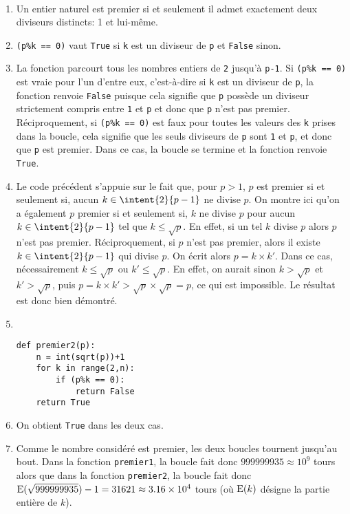\begin{correction}~
	\begin{enumerate}
		\item Un entier naturel est premier si et seulement il admet exactement deux diviseurs distincts: 1 et lui-même.
		\item \texttt{(p\%k == 0)} vaut \texttt{True} si \texttt{k} est un diviseur de \texttt{p} et \texttt{False} sinon.
		\item La fonction parcourt tous les nombres entiers de \texttt{2} jusqu'à \texttt{p-1}. Si \texttt{(p\%k == 0)} est vraie pour l'un d'entre eux, c'est-à-dire si \texttt{k} est un diviseur de \texttt{p}, la fonction renvoie \texttt{False} puisque cela signifie que \texttt{p} possède un diviseur strictement compris entre \texttt{1} et \texttt{p} et donc que \texttt{p} n'est pas premier. Réciproquement, si \texttt{(p\%k == 0)} est faux pour toutes les valeurs des \texttt{k} prises dans la boucle, cela signifie que les seuls diviseurs de \texttt{p} sont \texttt{1} et \texttt{p}, et donc que \texttt{p} est premier. Dans ce cas, la boucle se termine et la fonction renvoie \texttt{True}.
		\item Le code précédent s'appuie sur le fait que, pour $p>1$, $p$ est premier si et seulement si, aucun $k\in\intent{2}{p-1}$ ne divise $p$. On montre ici qu'on a également $p$ premier si et seulement si, $k$ ne divise $p$ pour aucun $k\in\intent{2}{p-1}$ tel que $k\leq \sqrt{p}$. En effet, si un tel $k$ divise $p$ alors $p$ n'est pas premier. Réciproquement, si $p$ n'est pas premier, alors il existe $k\in\intent{2}{p-1}$ qui divise $p$. On écrit alors $p=k\times k'$. Dans ce cas, nécessairement $k\leq \sqrt{p}$ ou $k'\leq \sqrt{p}$. En effet, on aurait sinon $k>\sqrt{p}$ et $k'>\sqrt{p}$, puis $p=k\times k'>\sqrt{p}\times \sqrt{p}=p$, ce qui est impossible. Le résultat est donc bien démontré.
		\item ~
		\begin{center}
			\begin{varwidth}[t]{.5\textwidth}
				\begin{lstlisting}[language=iPython,linewidth = 7cm]
def premier2(p):
	n = int(sqrt(p))+1
    for k in range(2,n):
        if (p%k == 0):
            return False
    return True
\end{lstlisting}\end{varwidth}\end{center}
		\item On obtient \texttt{True} dans les deux cas.
		\item Comme le nombre considéré est premier, les deux boucles tournent jusqu'au bout. Dans la fonction \texttt{premier1}, la boucle fait donc $999999935\approx 10^9$ tours alors que dans la fonction \texttt{premier2}, la boucle fait donc $\textnormal{E}(\sqrt{999999935})-1=31621\approx 3.16\times 10^4$ tours (où $\textnormal{E}(k)$ désigne la partie entière de $k$).

\end{enumerate}
\end{correction}
